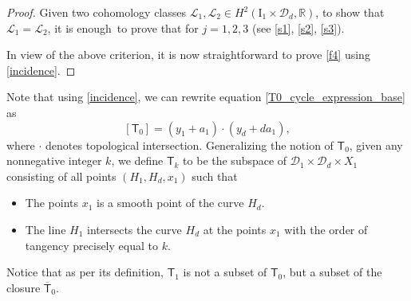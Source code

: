 \documentclass[pdftex]{sigma}
\numberwithin{equation}{section}
\begin{document}
\begin{proof}
Given two cohomology classes ${\mathcal L}_1, {\mathcal L}_2  \in H^2(\mathrm{I}_1\times \mathcal{D}_d,
{\mathbb R})$, to show that
${\mathcal L}_1 = {\mathcal L}_2$, it is enough~to prove that
for $j = 1, 2, 3$ (see \eqref{s1}, \eqref{s2}, \eqref{s3}).

In view of the above criterion, it is now straightforward to prove \eqref{f4} using \eqref{incidence}.
\end{proof}

Note that using \eqref{incidence}, we can rewrite equation \eqref{T0_cycle_expression_base} as
\begin{equation}\label{T0_cycle_expression_base_ag}
[\mathsf{T}_0]  =  (y_1 + a_1)\cdot(y_d + d a_1),
\end{equation}
where $\cdot$ denotes topological intersection. Generalizing the notion of
$\mathsf{T}_0$, given any nonnegative integer $k$, we define $\mathsf{T}_k$
to be the subspace of $\mathcal{D}_1 \times \mathcal{D}_d\times X_1$
consisting of all points $(H_1, H_d, x_1)$ such that
\begin{itemize}\itemsep=0pt
\item The points $x_1$ is a smooth point of the curve $H_d$.
\item The line $H_1$
intersects the curve $H_d$ at the points $x_1$
with the order of tangency precisely equal to $k$.
\end{itemize}
Notice that as per its definition, $\mathsf{T}_1$ is not a subset of $\mathsf{T}_0$, but a subset of the
closure $\overline{\mathsf{T}}_0$.
\end{document}
